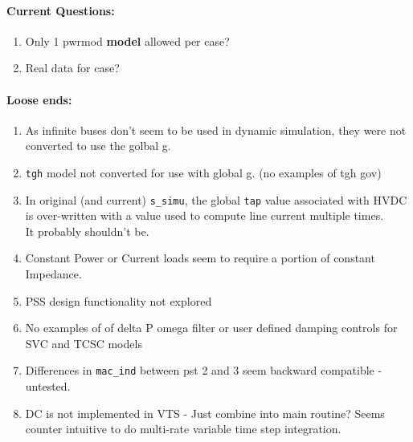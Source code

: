\documentclass[12pt]{article}
\begin{document}
\begin{multicols}{2}
	

\vfill\null
\columnbreak




\paragraph{Current Questions:}
	\begin{enumerate}
	\itemsep0em 
	
	\item Only 1 pwrmod \textbf{model} allowed per case?
	\item Real data for case?
	
	\end{enumerate}	

\paragraph{Loose ends:} %
	\begin{enumerate}
	\item As infinite buses don't seem to be used in dynamic simulation, they were not converted to use the golbal g.
		\item \verb|tgh| model not converted for use with global g. (no examples of tgh gov)
		\item In original (and current) \verb|s_simu|, the global \verb|tap| value associated with HVDC is over-written with  a value used to compute line current multiple times. \\It probably shouldn't be.
		\item Constant Power or Current loads seem to require a portion of constant Impedance.
		\item PSS design functionality not explored
		\item No examples of of delta P omega filter or user defined damping controls for SVC and TCSC models
		\item Differences in \verb|mac_ind| between pst 2 and 3 seem backward compatible - untested.
		\item DC is not implemented in VTS - Just combine into main routine? Seems counter intuitive to do multi-rate variable time step integration.
	\end{enumerate}
	

\end{multicols}
\end{document}
